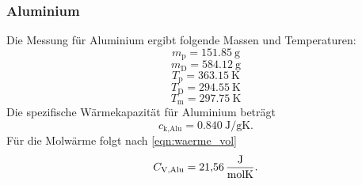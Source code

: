 \subsubsection{Aluminium}
Die Messung für Aluminium ergibt folgende Massen und Temperaturen:
\begin{equation*}
    m_\text{p} = \SI{151.85}{\gram}
\end{equation*}
\begin{equation*}
    m_\text{D} = \SI{584.12}{\gram}
\end{equation*}
\begin{equation*}
    T_\text{p} = \SI{363.15}{\kelvin}
\end{equation*}
\begin{equation*}
    T_\text{D} = \SI{294.55}{\kelvin}
\end{equation*}
\begin{equation*}
    T_\text{m} = \SI{297.75}{\kelvin}
\end{equation*}
Die spezifische Wärmekapazität für Aluminium beträgt
\begin{equation}
    c_\text{k,Alu} = \SI{0.840}{\joule/\gram\kelvin} .
\end{equation}
Für die Molwärme folgt nach \eqref{eqn:waerme_vol}
\begin{equation}
    C_\text{V,Alu} = \SI{21.56}{\frac{\joule}{\mol\kelvin}} .
\end{equation}